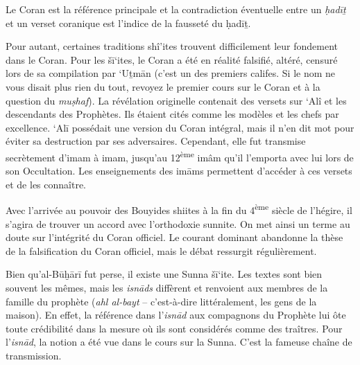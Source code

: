 

Le Coran est la référence principale et la contradiction éventuelle
entre un \emph{ḥadīṯ} et un verset coranique est l'indice de la fausseté
du ḥadīṯ.

Pour autant, certaines traditions shî'ites trouvent difficilement leur
fondement dans le Coran. Pour les šī`ites, le Coran a été en réalité
falsifié, altéré, censuré lors de sa compilation par `Uṯmān (c'est un
des premiers califes. Si le nom ne vous disait plus rien du tout,
revoyez le premier cours sur le Coran et à la question du
\emph{muṣhaf}). La révélation originelle contenait des versets sur `Alî
et les descendants des Prophètes. Ils étaient cités comme les modèles et
les chefs par excellence. `Alī possédait une version du Coran intégral,
mais il n'en dit mot pour éviter sa destruction par ses adversaires.
Cependant, elle fut transmise secrètement d'imam à imam, jusqu'au
12\textsuperscript{ème} imâm qu'il l'emporta avec lui lors de son
Occultation. Les enseignements des imāms permettent d'accéder à ces
versets et de les connaître.

Avec l'arrivée au pouvoir des Bouyides shiites à la fin du
4\textsuperscript{ème} siècle de l'hégire, il s'agira de trouver un
accord avec l'orthodoxie sunnite. On met ainsi un terme au doute sur
l'intégrité du Coran officiel. Le courant dominant abandonne la thèse de
la falsification du Coran officiel, mais le débat ressurgit
régulièrement.


Bien qu'al-Būḫārī fut perse, il existe une Sunna šī`ite. Les textes sont
bien souvent les mêmes, mais les \emph{isnāds} diffèrent et renvoient
aux membres de la famille du prophète (\emph{ahl al-bayt} --
c'est-à-dire littéralement, les gens de la maison). En effet, la
référence dans l'\emph{isnād} aux compagnons du Prophète lui ôte toute
crédibilité dans la mesure où ils sont considérés comme des traîtres.
Pour l'\emph{isnād}, la notion a été vue dans le cours sur la Sunna.
C'est la fameuse chaîne de transmission.

